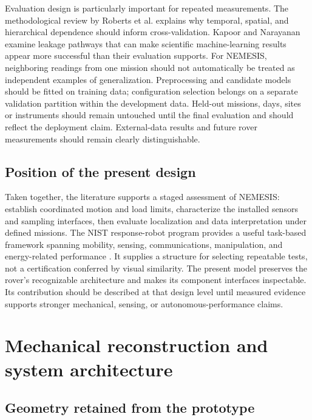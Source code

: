 \documentclass[11pt,a4paper]{article}
\begin{document}
Evaluation design is particularly important for repeated measurements. The methodological review by Roberts et al. \citep{roberts2017_8ac43f} explains why temporal, spatial, and hierarchical dependence should inform cross-validation. Kapoor and Narayanan \citep{kapoor2023_8dd715} examine leakage pathways that can make scientific machine-learning results appear more successful than their evaluation supports. For NEMESIS, neighboring readings from one mission should not automatically be treated as independent examples of generalization. Preprocessing and candidate models should be fitted on training data; configuration selection belongs on a separate validation partition within the development data. Held-out missions, days, sites or instruments should remain untouched until the final evaluation and should reflect the deployment claim. External-data results and future rover measurements should remain clearly distinguishable.

\FloatBarrier

\subsection{Position of the present design}\label{sec:3.8}

Taken together, the literature supports a staged assessment of NEMESIS: establish coordinated motion and load limits, characterize the installed sensors and sampling interfaces, then evaluate localization and data interpretation under defined missions. The NIST response-robot program provides a useful task-based framework spanning mobility, sensing, communications, manipulation, and energy-related performance \citep{nist2026_a8b13c}. It supplies a structure for selecting repeatable tests, not a certification conferred by visual similarity. The present model preserves the rover’s recognizable architecture and makes its component interfaces inspectable. Its contribution should be described at that design level until measured evidence supports stronger mechanical, sensing, or autonomous-performance claims.

\FloatBarrier

\section{Mechanical reconstruction and system architecture}\label{sec:4}

\FloatBarrier

\subsection{Geometry retained from the prototype}\label{sec:4.1}
\end{document}

